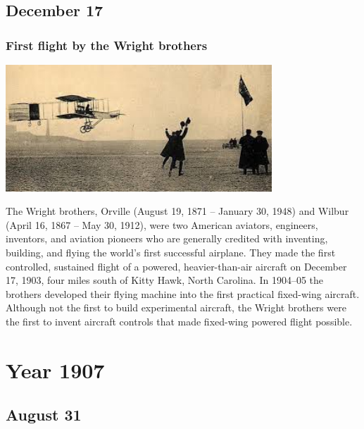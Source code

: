 \documentclass[11pt]{report}
\begin{document}
\section{December 17}
\subsection{First flight by the Wright brothers}
\vspace{2mm}\begin{center}\includegraphics[width=10cm]{./img/flight.jpg}\end{center}
The Wright brothers, Orville (August 19, 1871 – January 30, 1948) and Wilbur (April 16, 1867 – May 30, 1912), were two American aviators, engineers, inventors, and aviation pioneers who are generally credited with inventing, building, and flying the world's first successful airplane. They made the first controlled, sustained flight of a powered, heavier-than-air aircraft on December 17, 1903, four miles south of Kitty Hawk, North Carolina. In 1904–05 the brothers developed their flying machine into the first practical fixed-wing aircraft. Although not the first to build experimental aircraft, the Wright brothers were the first to invent aircraft controls that made fixed-wing powered flight possible.

\chapter{Year 1907}
\section{August 31}
\end{document}
